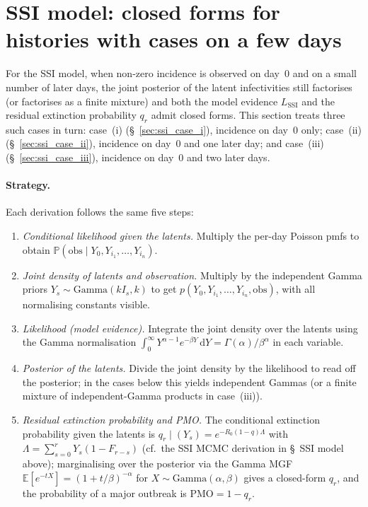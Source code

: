\documentclass{article}
\theoremstyle{definition}
\begin{document}
\section{SSI model: closed forms for histories with cases on a few days}
\label{sec:ssi_closed_forms}

For the SSI model, when non-zero incidence is observed on day~$0$ and
on a small number of later days, the joint posterior of the latent
infectivities still factorises (or factorises as a finite mixture) and
both the model evidence $L_\mathrm{SSI}$ and the residual extinction
probability $q_r$ admit closed forms.  This section treats three such
cases in turn: case~(i) (\S~\ref{sec:ssi_case_i}), incidence on day~$0$
only; case~(ii) (\S~\ref{sec:ssi_case_ii}), incidence on day~$0$ and one
later day; and case~(iii) (\S~\ref{sec:ssi_case_iii}), incidence on day~$0$
and two later days.

\paragraph{Strategy.}  Each derivation follows the same five steps:

\begin{enumerate}
  \item \emph{Conditional likelihood given the latents.}  Multiply the
    per-day Poisson pmfs to obtain
    $\mathbb{P}(\mathrm{obs} \mid Y_0, Y_{i_1}, \ldots, Y_{i_n})$.
  \item \emph{Joint density of latents and observation.}  Multiply by
    the independent Gamma priors $Y_s \sim \mathrm{Gamma}(k I_s, k)$ to
    get $p(Y_0, Y_{i_1}, \ldots, Y_{i_n}, \mathrm{obs})$, with all
    normalising constants visible.
  \item \emph{Likelihood (model evidence).}  Integrate the joint density
    over the latents using the Gamma normalisation
    $\int_0^\infty Y^{\alpha-1} e^{-\beta Y}\,\mathrm{d}Y =
    \Gamma(\alpha)/\beta^{\alpha}$ in each variable.
  \item \emph{Posterior of the latents.}  Divide the joint density by
    the likelihood to read off the posterior; in the cases below this
    yields independent Gammas (or a finite mixture of independent-Gamma
    products in case~(iii)).
  \item \emph{Residual extinction probability and PMO.}  The conditional
    extinction probability given the latents is
    $q_r \mid (Y_s) = e^{-R_0(1-q)\Lambda}$ with
    $\Lambda = \sum_{s=0}^r Y_s(1 - F_{r-s})$ (cf.\ the SSI MCMC
    derivation in \S~SSI model above); marginalising over the posterior
    via the Gamma MGF
    $\mathbb{E}[e^{-tX}] = (1 + t/\beta)^{-\alpha}$ for
    $X \sim \mathrm{Gamma}(\alpha, \beta)$ gives a closed-form $q_r$,
    and the probability of a major outbreak is $\mathrm{PMO} = 1 - q_r$.
\end{enumerate}
\end{document}
